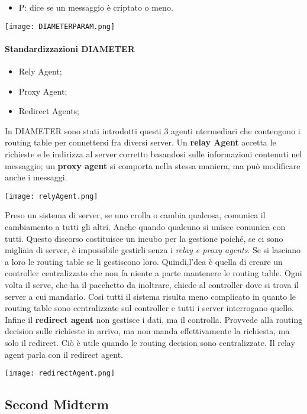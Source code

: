 \documentclass{article}
\theoremstyle{remark}
\begin{document}
\begin{itemize}
\begin{itemize}
\begin{itemize}
\begin{itemize}
                \item P: dice se un messaggio è criptato o meno.
            \end{itemize}
 \begin{center}
     \texttt{[image: DIAMETERPARAM.png]}
 \end{center}
        \end{itemize}
    \end{itemize}
\end{itemize}
\subsection{Standardizzazioni DIAMETER}
\begin{itemize}
    \item Rely Agent;
    \item Proxy Agent;
    \item Redirect Agents;
\end{itemize}
In DIAMETER sono stati introdotti questi 3 agenti ntermediari che contengono i routing table per connettersi fra diversi server.\newline
Un \textbf{relay Agent} accetta le richieste e le indirizza al server corretto basandosi sulle informazioni contenuti nel messaggio; un \textbf{proxy agent} si comporta nella stessa maniera, ma può modificare anche i messaggi.
\begin{center}
    \texttt{[image: relyAgent.png]}
\end{center}

Preso un sistema di server, se uno crolla o cambia qualcosa, comunica il cambiamento a tutti gli altri. Anche quando qualcuno si unisce comunica con tutti. Questo discorso costituisce un incubo per la gestione poiché, se ci sono migliaia di server, è impossibile gestirli senza i \emph{relay e proxy agents}. Se si lasciano a loro le routing table se li gestiscono loro.\newline
Quindi,l'dea è quella di creare un controller centralizzato che non fa niente a parte mantenere le routing table. Ogni volta il serve, che ha il pacchetto da inoltrare, chiede al controller dove si trova il server a cui mandarlo. Così tutti il sistema risulta meno complicato in quanto le routing table sono centralizzate sul controller e tutti i server interrogano quello.\newpage
Infine il \textbf{redirect agent} non gestisce i dati, ma il controlla. Provvede alla routing decision sulle richieste in arrivo, ma non manda effettivamente la richiesta, ma solo il redirect. Ciò è utile quando le routing decision sono centralizzate. Il relay agent parla con il redirect agent.
\begin{center}
    \texttt{[image: redirectAgent.png]}
\end{center}\newpage
\begin{center}
    \part{Second Midterm}
\end{center}
\end{document}
